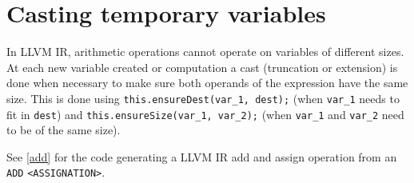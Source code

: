\section{Casting temporary variables}

In LLVM IR, arithmetic operations cannot operate on variables of different sizes. At each new variable created or computation a cast (truncation or extension) is done when necessary to make sure both operands of the expression have the same size. This is done using \verb!this.ensureDest(var_1, dest);! (when \verb!var_1! needs to fit in \verb!dest!) and \verb!this.ensureSize(var_1, var_2);! (when \verb!var_1! and \verb!var_2! need to be of the same size).

See \ref{add} for the code generating a LLVM IR add and assign operation from an \verb!ADD! \verb!<ASSIGNATION>!.


